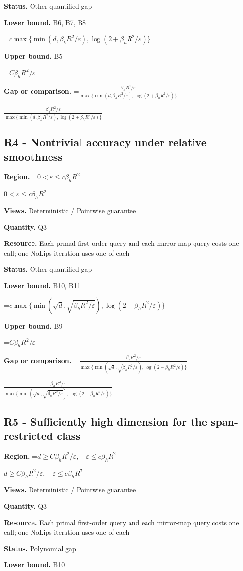 \documentclass[10pt,a4paper]{article}
\newcommand{\AtlasMath}[1]{\par\begingroup\centering\setbox0=\hbox{$\displaystyle #1$}\ifdim\wd0>1.4\linewidth\typeout{ATLAS WIDE FORMULA: \the\wd0}\fi\ifdim\wd0>\linewidth\resizebox{\linewidth}{!}{\box0}\else\box0\fi\par\endgroup}
\newcommand{\AtlasInlineMath}[1]{\begingroup\setbox0=\hbox{$#1$}\ifdim\wd0>.4\linewidth\endgroup\AtlasMath{#1}\else\endgroup$#1$\fi}
\begin{document}
\textbf{Status.} Other quantified gap

\textbf{Lower bound.} B6, B7, B8

\AtlasMath{c\max\{\min(d,\beta_hR^2/\varepsilon),\log(2+\beta_hR^2/\varepsilon)\}}
\textbf{Upper bound.} B5

\AtlasMath{C\beta_hR^2/\varepsilon}
\textbf{Gap or comparison.} \AtlasInlineMath{\frac{\beta_hR^2/\varepsilon}{\max\{\min(d,\beta_hR^2/\varepsilon),\log(2+\beta_hR^2/\varepsilon)\}}}

\subsection{R4 - Nontrivial accuracy under relative smoothness}
\textbf{Region.} \AtlasInlineMath{0<\varepsilon\le c\beta_hR^2}

\textbf{Views.} Deterministic / Pointwise guarantee

\textbf{Quantity.} Q3

\textbf{Resource.} Each primal first-order query and each mirror-map query costs one call; one NoLips iteration uses one of each.

\textbf{Status.} Other quantified gap

\textbf{Lower bound.} B10, B11

\AtlasMath{c\max\{\min(\sqrt d,\sqrt{\beta_hR^2/\varepsilon}),\log(2+\beta_hR^2/\varepsilon)\}}
\textbf{Upper bound.} B9

\AtlasMath{C\beta_hR^2/\varepsilon}
\textbf{Gap or comparison.} \AtlasInlineMath{\frac{\beta_hR^2/\varepsilon}{\max\{\min(\sqrt d,\sqrt{\beta_hR^2/\varepsilon}),\log(2+\beta_hR^2/\varepsilon)\}}}

\subsection{R5 - Sufficiently high dimension for the span-restricted class}
\textbf{Region.} \AtlasInlineMath{d\ge C\beta_hR^2/\varepsilon,\quad\varepsilon\le c\beta_hR^2}

\textbf{Views.} Deterministic / Pointwise guarantee

\textbf{Quantity.} Q3

\textbf{Resource.} Each primal first-order query and each mirror-map query costs one call; one NoLips iteration uses one of each.

\textbf{Status.} Polynomial gap

\textbf{Lower bound.} B10
\end{document}
